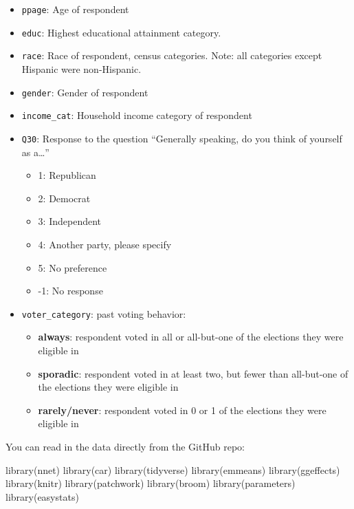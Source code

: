 \documentclass[
  letterpaper,
  DIV=11,
  numbers=noendperiod]{scrartcl}
\newenvironment{Shaded}{\begin{snugshade}}{\end{snugshade}}
\newcommand{\FunctionTok}[1]{\textcolor[rgb]{0.28,0.35,0.67}{#1}}
\newcommand{\NormalTok}[1]{\textcolor[rgb]{0.00,0.23,0.31}{#1}}
\providecommand{\tightlist}{%
  \setlength{\itemsep}{0pt}\setlength{\parskip}{0pt}}\usepackage{longtable,booktabs,array}
\begin{document}
\begin{itemize}
\item
  \texttt{ppage}: Age of respondent
\item
  \texttt{educ}: Highest educational attainment category.\\
\item
  \texttt{race}: Race of respondent, census categories. Note: all
  categories except Hispanic were non-Hispanic.
\item
  \texttt{gender}: Gender of respondent
\item
  \texttt{income\_cat}: Household income category of respondent
\item
  \texttt{Q30}: Response to the question ``Generally speaking, do you
  think of yourself as a\ldots{}''

  \begin{itemize}
  \tightlist
  \item
    1: Republican
  \item
    2: Democrat
  \item
    3: Independent
  \item
    4: Another party, please specify
  \item
    5: No preference
  \item
    -1: No response
  \end{itemize}
\item
  \texttt{voter\_category}: past voting behavior:

  \begin{itemize}
  \tightlist
  \item
    \textbf{always}: respondent voted in all or all-but-one of the
    elections they were eligible in
  \item
    \textbf{sporadic}: respondent voted in at least two, but fewer than
    all-but-one of the elections they were eligible in
  \item
    \textbf{rarely/never}: respondent voted in 0 or 1 of the elections
    they were eligible in
  \end{itemize}
\end{itemize}

You can read in the data directly from the GitHub repo:

\begin{Shaded}
\begin{Highlighting}[]
\FunctionTok{library}\NormalTok{(nnet)}
\FunctionTok{library}\NormalTok{(car)}
\FunctionTok{library}\NormalTok{(tidyverse)}
\FunctionTok{library}\NormalTok{(emmeans)}
\FunctionTok{library}\NormalTok{(ggeffects)}
\FunctionTok{library}\NormalTok{(knitr)}
\FunctionTok{library}\NormalTok{(patchwork)}
\FunctionTok{library}\NormalTok{(broom)}
\FunctionTok{library}\NormalTok{(parameters)}
\FunctionTok{library}\NormalTok{(easystats)}
\end{Highlighting}
\end{Shaded}
\end{document}
